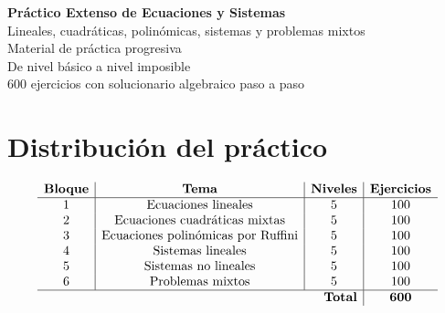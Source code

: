 \documentclass[10pt,a4paper]{article}
\begin{document}
\begin{titlepage}
\centering
\vspace*{2cm}
{\Huge\bfseries Práctico Extenso de Ecuaciones y Sistemas\\[0.4cm]}
{\Large Lineales, cuadráticas, polinómicas, sistemas y problemas mixtos\\[1cm]}
\vfill
{\Large Material de práctica progresiva}\\[0.3cm]
{\large De nivel básico a nivel imposible}\\[1cm]
\vfill
{\large 600 ejercicios con solucionario algebraico paso a paso}\\[1cm]
\end{titlepage}

\tableofcontents
\newpage
\small

\section*{Distribución del práctico}

\[
\begin{array}{c|c|c|c}
\textbf{Bloque} & \textbf{Tema} & \textbf{Niveles} & \textbf{Ejercicios}\\ \hline
1 & \text{Ecuaciones lineales} & 5 & 100\\
2 & \text{Ecuaciones cuadráticas mixtas} & 5 & 100\\
3 & \text{Ecuaciones polinómicas por Ruffini} & 5 & 100\\
4 & \text{Sistemas lineales} & 5 & 100\\
5 & \text{Sistemas no lineales} & 5 & 100\\
6 & \text{Problemas mixtos} & 5 & 100\\ \hline
\multicolumn{3}{r|}{\textbf{Total}} & \textbf{600}
\end{array}
\]
\newpage
\end{document}
